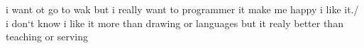 i want ot go to wak
but i really want to programmer it make me happy i like it./ i don`t know i like it more than drawing or languages but it realy better than teaching or serving